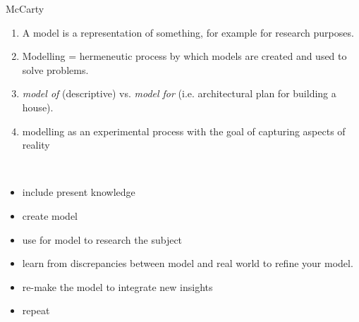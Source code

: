 \begin{frame}[allowframebreaks]{McCarty}

\begin{enumerate}
    \item A model is a representation of something, for example for research purposes.
    \item Modelling = hermeneutic process by which models are created and used to solve problems.
    \item \emph{model of} (descriptive) vs. \emph{model for} (i.e. architectural plan for building a house).
    \item modelling as an experimental process with the goal of capturing aspects of reality
\end{enumerate}
\framebreak

 \\
\begin{itemize}
    \item include present knowledge
    \item create model
    \item use for model to research the subject
    \item learn from discrepancies between model and real world to refine your model. 
    \item re-make the model to integrate new insights
    \item repeat
\end{itemize}

\end{frame}

